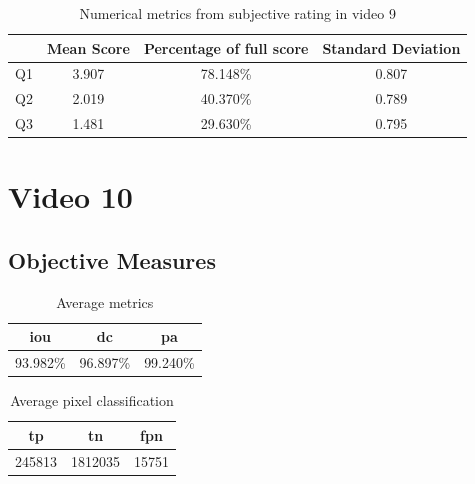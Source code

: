 \begin{table}[H]
    \centering
    \begin{tabular}{|c|c c c|} 
        \hline
           & \textbf{Mean Score} & \textbf{Percentage of full score} & \textbf{Standard Deviation} \\ [0.5ex] 
        \hline
        Q1 & 3.907 & 78.148\% & 0.807 \\ [1ex] 
        Q2 & 2.019 & 40.370\% & 0.789 \\ [1ex] 
        Q3 & 1.481 & 29.630\% & 0.795 \\ [1ex] 
        \hline
    \end{tabular}
    \caption{Numerical metrics from subjective rating in video 9}
    \label{tab:numerical_subj_vid9}
\end{table}




\section{Video 10}
\subsection{Objective Measures}

\begin{minipage}[c]{0.475\textwidth}
\begin{table}[H]
    \centering
    \begin{tabular}{||c c c||} 
        \hline
        \acrshort{iou} & \acrshort{dc} & \acrshort{pa} \\ [0.5ex] 
        \hline\hline
        93.982\% & 96.897\% & 99.240\% \\ [1ex] 
        \hline
    \end{tabular}
    \caption{Average metrics}
    \label{tab:metrics_video_10}
\end{table}
\end{minipage}
\begin{minipage}[c]{0.475\textwidth}
\begin{table}[H]
    \centering
    \begin{tabular}{||c c c||} 
        \hline
        \acrshort{tp} & \acrshort{tn} & \acrshort{fpn} \\ [0.5ex] 
        \hline\hline
        245813 & 1812035 & 15751 \\ [1ex] 
        \hline
    \end{tabular}
    \caption{Average pixel classification}
    \label{tab:pixels_video_10}
\end{table}
\end{minipage}

